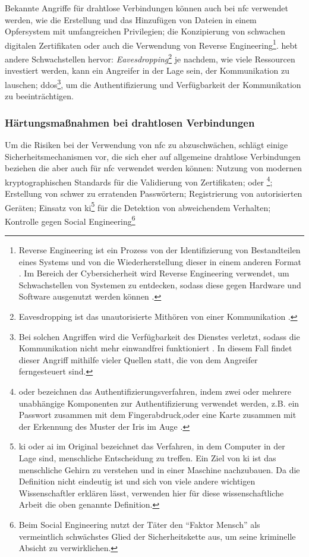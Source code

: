 Bekannte Angriffe für drahtlose Verbindungen können auch bei \acrshort{nfc} verwendet werden\cite{refip:NYRS}, wie die
Erstellung und das Hinzufügen von Dateien in einem Opfersystem mit umfangreichen Privilegien; die Konzipierung
von schwachen digitalen Zertifikaten oder auch die Verwendung von Reverse Engineering\footnote{Reverse
Engineering ist ein Prozess von der Identifizierung von Bestandteilen eines Systems und von die Wiederherstellung 
dieser in einem anderen Format \cite{refart:CHRE}. Im Bereich der Cybersicherheit wird Reverse Engineering 
verwendet, um Schwachstellen von Systemen zu entdecken, sodass diese gegen Hardware und Software ausgenutzt
werden können \cite{refip:CMBM}.}. \cite{refart:ALSI} hebt andere Schwachstellen hervor: 
\textit{Eavesdropping}\footnote{Eavesdropping ist das unautorisierte Mithören von einer Kommunikation 
\cite{refbook:SWIS}.} je nachdem, wie viele Ressourcen investiert werden, kann ein Angreifer in der 
Lage sein, der Kommunikation zu lauschen; \acrfull{ddos}\footnote{Bei solchen Angriffen wird die
Verfügbarkeit des Dienstes verletzt, sodass die Kommunikation nicht mehr einwandfrei funktioniert \cite{refbook:SWIS}. 
In diesem Fall findet dieser Angriff mithilfe vieler Quellen statt, die von dem Angreifer ferngesteuert sind.},
um die Authentifizierung und Verfügbarkeit der Kommunikation zu beeinträchtigen.


\subsubsection{Härtungsmaßnahmen bei drahtlosen Verbindungen}

Um die Risiken bei der Verwendung von \acrshort{nfc} zu abzuschwächen, schlägt \cite{refip:NYRS} einige Sicherheitsmechanismen vor, 
die sich eher auf allgemeine drahtlose Verbindungen beziehen die aber auch für \acrshort{nfc} verwendet werden können: Nutzung
von modernen kryptographischen Standards für die Validierung von Zertifikaten;  oder \footnote{ oder  bezeichnen das Authentifizierungsverfahren, indem zwei oder mehrere 
unabhängige Komponenten zur Authentifizierung verwendet werden, z.B. ein Passwort zusammen mit dem Fingerabdruck,oder eine Karte 
zusammen mit der Erkennung des Muster der Iris im Auge \cite{refip:simf}.}; Erstellung von schwer zu erratenden Passwörtern;
Registrierung von autorisierten Geräten; Einsatz von \acrlong{ki}\footnote{\acrlong{ki} oder \acrlong{ai} im Original
bezeichnet das Verfahren, in dem Computer in der Lage sind, menschliche Entscheidung zu treffen\cite{refart:HAKI}. Ein Ziel
von \acrshort{ki} ist das menschliche Gehirn zu verstehen und in einer Maschine nachzubauen. Da die Definition nicht eindeutig 
ist und sich von viele andere wichtigen Wissenschaftler erklären lässt, verwenden hier für diese wissenschaftliche Arbeit die oben
genannte Definition.} für die Detektion von abweichendem Verhalten; Kontrolle gegen Social Engineering\footnote{Beim Social Engineering 
nutzt der Täter den ``Faktor Mensch'' als vermeintlich schwächstes Glied der Sicherheitskette aus, um seine kriminelle Absicht zu 
verwirklichen.\cite{booklet:BSSE}}

